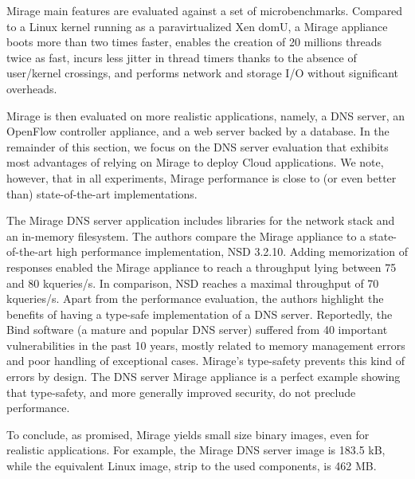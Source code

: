 Mirage main features are evaluated against a set of microbenchmarks.
Compared to a Linux kernel running as a paravirtualized Xen domU, a Mirage appliance boots more than two times faster, enables the creation of 20 millions threads twice as fast, incurs less jitter in thread timers thanks to the absence of user/kernel crossings, and performs network and storage I/O without significant overheads.

Mirage is then evaluated on more realistic applications, namely, a DNS server, an OpenFlow controller appliance, and a web server backed by a database.
In the remainder of this section, we focus on the DNS server evaluation that exhibits most advantages of relying on Mirage to deploy Cloud applications.
We note, however, that in all experiments, Mirage performance is close to (or even better than) state-of-the-art implementations.

The Mirage DNS server application includes libraries for the network stack and an in-memory filesystem.
The authors compare the Mirage appliance to a state-of-the-art high performance implementation, NSD 3.2.10.
Adding memorization of responses enabled the Mirage appliance to reach a throughput lying between 75 and 80 kqueries/s.
In comparison, NSD reaches a maximal throughput of 70 kqueries/s.
Apart from the performance evaluation, the authors highlight the benefits of having a type-safe implementation of a DNS server.
Reportedly, the Bind software (a mature and popular DNS server) suffered from 40 important vulnerabilities in the past 10 years, mostly related to memory management errors and poor handling of exceptional cases.
Mirage's type-safety prevents this kind of errors by design.
The DNS server Mirage appliance is a perfect example showing that type-safety, and more generally improved security, do not  preclude performance. 

To conclude, as promised, Mirage yields small size binary images, even for realistic applications.
For example, the Mirage DNS server image is 183.5 kB, while the equivalent Linux image, strip to the used components, is 462 MB.


